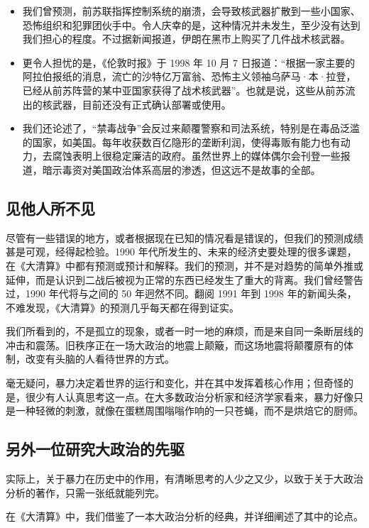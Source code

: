 \begin{itemize}
    \item 我们曾预测，前苏联指挥控制系统的崩溃，会导致核武器扩散到一些小国家、恐怖组织和犯罪团伙手中。令人庆幸的是，这种情况并未发生，至少没有达到我们担心的程度。不过据新闻报道，伊朗在黑市上购买了几件战术核武器。
    \item 更令人担忧的是，《伦敦时报》于 1998 年 10 月 7 日报道：“根据一家主要的阿拉伯报纸的消息，流亡的沙特亿万富翁、恐怖主义领袖乌萨马·本·拉登，已经从前苏阵营的某中亚国家获得了战术核武器”。也就是说，这些从前苏流出的核武器，目前还没有正式确认部署或使用。
    \item 我们还论述了，“禁毒战争”会反过来颠覆警察和司法系统，特别是在毒品泛滥的国家，如美国。每年收获数百亿隐形的垄断利润，使得毒贩有能力也有动力，去腐蚀表明上很稳定廉洁的政府。虽然世界上的媒体偶尔会刊登一些报道，暗示毒资对美国政治体系高层的渗透，但这远不是故事的全部。
\end{itemize}

\subsection{见他人所不见}
尽管有一些错误的地方，或者根据现在已知的情况看是错误的，但我们的预测成绩甚是可观，经得起检验。1990 年代所发生的、未来的经济史要处理的很多课题，在《大清算》中都有预测或预计和解释。我们的预测，并不是对趋势的简单外推或延伸，而是认识到二战后被视为正常的东西已经发生了重大的背离。我们曾经警告过，1990 年代将与之间的 50 年迥然不同。翻阅 1991 年到 1998 年的新闻头条，不难发现，《大清算》的预测几乎每天都在得到证实。

我们所看到的，不是孤立的现象，或者一时一地的麻烦，而是来自同一条断层线的冲击和震荡。旧秩序正在一场大政治的地震上颠簸，而这场地震将颠覆原有的体制，改变有头脑的人看待世界的方式。

毫无疑问，暴力决定着世界的运行和变化，并在其中发挥着核心作用；但奇怪的是，很少有人认真思考这一点。在大多数政治分析家和经济学家看来，暴力好像只是一种轻微的刺激，就像在蛋糕周围嗡嗡作响的一只苍蝇，而不是烘焙它的厨师。


\subsection{另外一位研究大政治的先驱}
实际上，关于暴力在历史中的作用，有清晰思考的人少之又少，以致于关于大政治分析的著作，只需一张纸就能列完。

在《大清算》中，我们借鉴了一本大政治分析的经典，并详细阐述了其中的论点。


